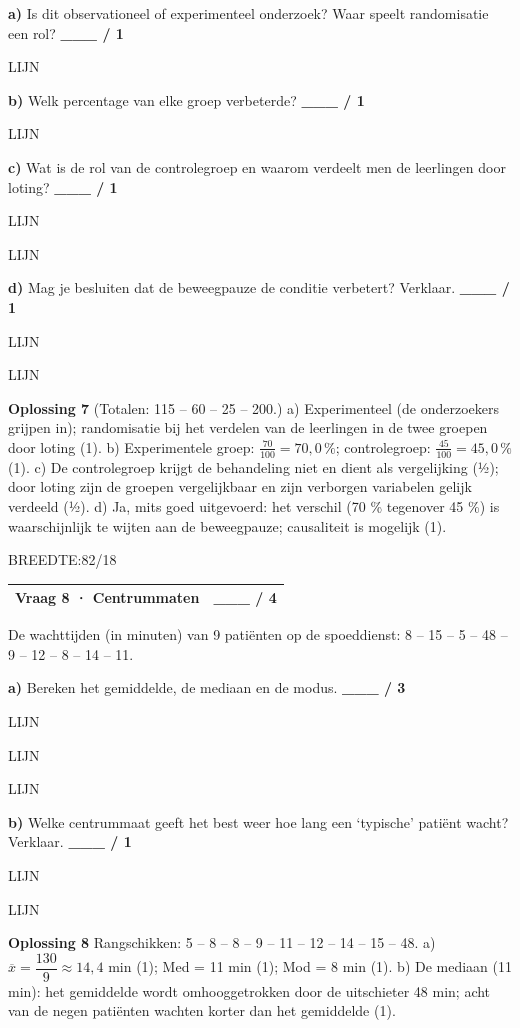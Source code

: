 \documentclass{article}
\newcommand{\lijn}{\par LIJN\par}
\newcommand{\breedtes}[1]{\par BREEDTE:#1\par}
\begin{document}
\textbf{a)} Is dit observationeel of experimenteel onderzoek? Waar speelt randomisatie een rol? \hfill \textbf{\_\_\_ / 1} \lijn 

\textbf{b)} Welk percentage van elke groep verbeterde? \hfill \textbf{\_\_\_ / 1} \lijn 

\textbf{c)} Wat is de rol van de controlegroep en waarom verdeelt men de leerlingen door loting? \hfill \textbf{\_\_\_ / 1} \lijn \lijn 

\textbf{d)} Mag je besluiten dat de beweegpauze de conditie verbetert? Verklaar. \hfill \textbf{\_\_\_ / 1} \lijn \lijn 

\begin{oplossing}
\textbf{Oplossing 7} \quad (Totalen: 115 – 60 – 25 – 200.) a) Experimenteel (de onderzoekers grijpen in); randomisatie bij het verdelen van de leerlingen in de twee groepen door loting (1). b) Experimentele groep: $\frac{70}{100}=70{,}0\,\%$; controlegroep: $\frac{45}{100}=45{,}0\,\%$ (1). c) De controlegroep krijgt de behandeling niet en dient als vergelijking (½); door loting zijn de groepen vergelijkbaar en zijn verborgen variabelen gelijk verdeeld (½). d) Ja, mits goed uitgevoerd: het verschil (70 \% tegenover 45 \%) is waarschijnlijk te wijten aan de beweegpauze; causaliteit is mogelijk (1).
\end{oplossing}

\breedtes{82/18}
\begin{tabular}{lc}
\hline
Vraag 8 · Centrummaten & \_\_\_ / 4 \\
\hline
\end{tabular}

De wachttijden (in minuten) van 9 patiënten op de spoeddienst: 8 – 15 – 5 – 48 – 9 – 12 – 8 – 14 – 11.

\textbf{a)} Bereken het gemiddelde, de mediaan en de modus. \hfill \textbf{\_\_\_ / 3} \lijn \lijn \lijn 

\textbf{b)} Welke centrummaat geeft het best weer hoe lang een ‘typische’ patiënt wacht? Verklaar. \hfill \textbf{\_\_\_ / 1} \lijn \lijn 

\begin{oplossing}
\textbf{Oplossing 8} \quad Rangschikken: 5 – 8 – 8 – 9 – 11 – 12 – 14 – 15 – 48. a) $\overline{x}=\dfrac{130}{9}\approx 14{,}4$ min (1); Med = 11 min (1); Mod = 8 min (1). b) De mediaan (11 min): het gemiddelde wordt omhooggetrokken door de uitschieter 48 min; acht van de negen patiënten wachten korter dan het gemiddelde (1).
\end{oplossing}
\end{document}
